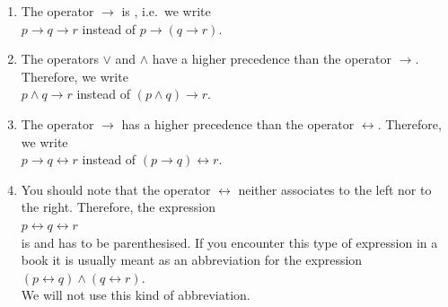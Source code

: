 \begin{enumerate}
      In the programming languages  \texttt{C}, \textsl{Java}, and \textsl{Python} the logical and also has a higher
      precedence than the logical or. 
\item The operator $\rightarrow$ is \underline{}\underline{}, i.e.~we write \\[0.2cm]
      \hspace*{1.3cm} $p \rightarrow q \rightarrow r$ \quad instead of \quad $p \rightarrow (q \rightarrow r)$.
\item The operators  $\vee$ and $\wedge$ have a higher precedence than the operator $\rightarrow$.  Therefore,
      we write \\[0.2cm]
      \hspace*{1.3cm} $p \wedge q \rightarrow r$ \quad instead of \quad $(p \wedge q) \rightarrow r$.
\item The operator $\rightarrow$ has a higher precedence than the operator $\leftrightarrow$.  Therefore, we write \\[0.2cm]
      \hspace*{1.3cm} $p \rightarrow q \leftrightarrow r$ \quad instead of \quad $(p \rightarrow q) \leftrightarrow
      r$.
\item You should note that the operator $\leftrightarrow$ neither associates to the left nor to the right.
      Therefore, the expression
      \\[0.2cm]
      \hspace*{1.3cm}
      $p \leftrightarrow q \leftrightarrow r$
      \\[0.2cm]
      is \underline{\textbf{}} and has to be parenthesised.  If you encounter this type of expression
      in a book it is usually meant as an abbreviation for the expression
      \\[0.2cm]
      \hspace*{1.3cm}
      $(p \leftrightarrow q) \wedge (q \leftrightarrow r)$.
      \\[0.2cm]
      We will not use this kind of abbreviation.
\end{enumerate}

